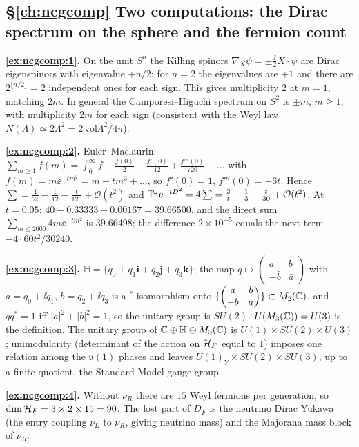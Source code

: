 {\subsection*{\S\ref{ch:ncgcomp} Two computations: the Dirac spectrum on the sphere and the fermion count}
\textbf{\ref{ex:ncgcomp:1}.} On the unit $S^n$ the Killing spinors $\nabla_X\psi=\pm\frac\ii2X\cdot\psi$ are Dirac eigenspinors with eigenvalue $\mp n/2$; for $n=2$ the eigenvalues are $\mp1$ and there are $2^{\lfloor n/2\rfloor}=2$ independent ones for each sign. This gives multiplicity $2$ at $m=1$, matching $2m$. In general the Camporesi--Higuchi spectrum on $S^2$ is $\pm m$, $m\ge1$, with multiplicity $2m$ for each sign (consistent with the Weyl law $N(\Lambda)\simeq2\Lambda^2=2\,\mathrm{vol}\Lambda^2/4\pi$).\par
\textbf{\ref{ex:ncgcomp:2}.} Euler--Maclaurin: $\sum_{m\ge1}f(m)=\int_0^\infty f-\frac{f(0)}2-\frac{f'(0)}{12}+\frac{f'''(0)}{720}-\dots$ with $f(m)=m\ee^{-tm^2}=m-tm^3+\dots$, so $f'(0)=1$, $f'''(0)=-6t$. Hence $\sum=\frac1{2t}-\frac1{12}-\frac t{120}+\mathcal O(t^2)$ and $\operatorname{Tr}\mathrm{e}^{-tD^2}=4\sum=\frac2t-\frac13-\frac t{30}+\mathcal O(t^2)$. At $t=0.05$: $40-0.33333-0.00167=39.66500$, and the direct sum $\sum_{m\le2000}4m\ee^{-tm^2}$ is $39.66498$; the difference $2\times10^{-5}$ equals the next term $-4\cdot60t^2/30240$.\par
\textbf{\ref{ex:ncgcomp:3}.} $\mathbb H=\{q_0+q_1\mathbf i+q_2\mathbf j+q_3\mathbf k\}$; the map $q\mapsto\begin{pmatrix}a&b\\-\bar b&\bar a\end{pmatrix}$ with $a=q_0+\ii q_1$, $b=q_2+\ii q_3$ is a $^*$-isomorphism onto $\{\begin{pmatrix}a&b\\-\bar b&\bar a\end{pmatrix}\}\subset M_2(\mathbb{C})$, and $qq^*=1$ iff $|a|^2+|b|^2=1$, so the unitary group is $SU(2)$. $U(M_3(\mathbb{C}))=U(3)$ is the definition. The unitary group of $\mathbb{C}\oplus\mathbb H\oplus M_3(\mathbb{C})$ is $U(1)\times SU(2)\times U(3)$; unimodularity (determinant of the action on $\mathcal{H}_F$ equal to $1$) imposes one relation among the $\mathfrak u(1)$ phases and leaves $U(1)_Y\times SU(2)\times SU(3)$, up to a finite quotient, the Standard Model gauge group.\par
\textbf{\ref{ex:ncgcomp:4}.} Without $\nu_R$ there are $15$ Weyl fermions per generation, so $\dim\mathcal{H}_F=3\times2\times15=90$. The lost part of $D_F$ is the neutrino Dirac Yukawa (the entry coupling $\nu_L$ to $\nu_R$, giving neutrino mass) and the Majorana mass block of $\nu_R$.\par

}
